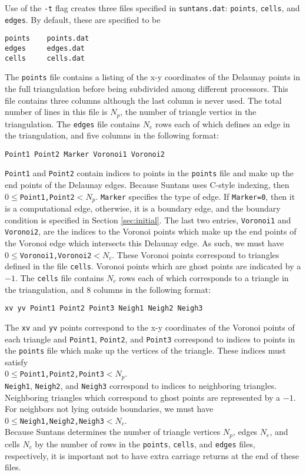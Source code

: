 \documentclass[12pt,oneside]{article}
\begin{document}
Use of the \verb+-t+ flag creates three files specified in \verb+suntans.dat+: 
\verb+points+, \verb+cells+, and \verb+edges+.  By default, these are specified
to be
\begin{verbatim}
points    points.dat
edges     edges.dat
cells     cells.dat
\end{verbatim}
The \verb+points+ file contains a listing of the x-y coordinates of the Delaunay points
in the full triangulation before being subdivided among different processors. 
This file contains three columns although the last column is never used.  The
total number of lines in this file is $N_p$, the number of triangle vertics in the triangulation.
The \verb+edges+ file contains $N_e$ rows each of which defines an
edge in the triangulation, and five columns in the following format:
\begin{verbatim}
Point1 Point2 Marker Voronoi1 Voronoi2
\end{verbatim}
\verb+Point1+ and \verb+Point2+ contain indices to points in the \verb+points+ file
and make up the end points of the Delaunay edges.  Because Suntans uses C-style
indexing, then $0\le$\verb+Point1,Point2+$<N_p$.  \verb+Marker+ specifies the type
of edge.  If \verb+Marker=0+, then it is a computational edge, otherwise, it is
a boundary edge, and the boundary condition is specified in Section \ref{sec:initial}.
The last two entries, \verb+Voronoi1+ and \verb+Voronoi2+, are the indices to the Voronoi
points which make up the end points of the Voronoi edge which intersects this Delaunay edge.
As such, we must have $0\le$\verb+Voronoi1,Voronoi2+$<N_c$.
These Voronoi points correspond to triangles defined in the file \verb+cells+.  Voronoi points
which are ghost points are indicated by a $-1$.
The \verb+cells+ file contains $N_c$ rows each of which corresponds to a
triangle in the triangulation, and 8 columns in the following format:
\begin{verbatim}
xv yv Point1 Point2 Point3 Neigh1 Neigh2 Neigh3
\end{verbatim}
The \verb+xv+ and \verb+yv+ points correspond to the x-y coordinates
of the Voronoi points of each triangle and \verb+Point1+, \verb+Point2+, and \verb+Point3+
correspond to indices to points in the \verb+points+ file which make up the
vertices of the triangle.  These indices must satisfy \\
$0\le$\verb+Point1,Point2,Point3+$<N_p$. \\
\verb+Neigh1+, \verb+Neigh2+, and
\verb+Neigh3+ correspond to indices to neighboring triangles.  Neighboring
triangles which correspond to ghost points are represented by a $-1$.  For neighbors
not lying outside boundaries, we must have \\
$0\le$\verb+Neigh1,Neigh2,Neigh3+$<N_c$.\\
Because Suntans determines the number of triangle vertices $N_p$, edges $N_e$, and cells $N_c$
by the number of rows in the \verb+points+, \verb+cells+, and \verb+edges+ files, respectively,
it is important not to have extra carriage returns at the end of these files.
\end{document}

